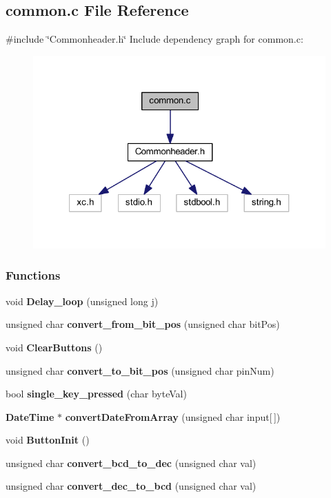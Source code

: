 \subsection{common.\+c File Reference}
\label{a00020}
{\ttfamily \#include \char`\"{}Commonheader.\+h\char`\"{}}\newline
Include dependency graph for common.\+c\+:
\nopagebreak
\begin{figure}[H]
\begin{center}
\leavevmode
\includegraphics[width=321pt]{a00021}
\end{center}
\end{figure}
\subsubsection*{Functions}
\begin{DoxyCompactItemize}
\item 
void \textbf{ Delay\+\_\+loop} (unsigned long j)
\item 
unsigned char \textbf{ convert\+\_\+from\+\_\+bit\+\_\+pos} (unsigned char bit\+Pos)
\item 
void \textbf{ Clear\+Buttons} ()
\item 
unsigned char \textbf{ convert\+\_\+to\+\_\+bit\+\_\+pos} (unsigned char pin\+Num)
\item 
bool \textbf{ single\+\_\+key\+\_\+pressed} (char byte\+Val)
\item 
\textbf{ Date\+Time} $\ast$ \textbf{ convert\+Date\+From\+Array} (unsigned char input[$\,$])
\item 
void \textbf{ Button\+Init} ()
\item 
unsigned char \textbf{ convert\+\_\+bcd\+\_\+to\+\_\+dec} (unsigned char val)
\item 
unsigned char \textbf{ convert\+\_\+dec\+\_\+to\+\_\+bcd} (unsigned char val)
\end{DoxyCompactItemize}


